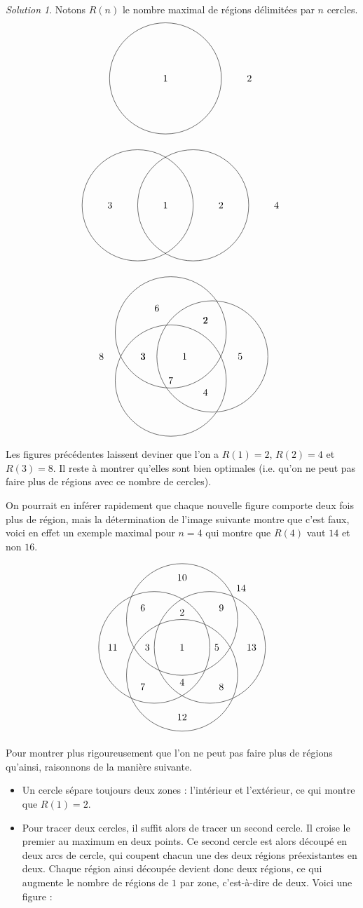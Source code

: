 \documentclass[14pt]{article}
\theoremstyle{remark}
\newtheorem*{sol}{Solution}
\newcounter{n}
\theoremstyle{plain}
\begin{document}
\begin{sol}

Notons $R(n)$ le nombre maximal de régions délimitées par $n$ cercles.
\[\begin{tikzpicture}
\draw (0,0) circle (2);
\draw (0,0) node{$1$};
\draw (3,0) node{$2$};
\end{tikzpicture}\]

\[\begin{tikzpicture}
\draw (0:1) circle (2); 
\draw(180:1) circle (2);
\draw (0,0) node{$1$};
\draw (2,0) node{$2$};
\draw (-2,0) node{$3$};
\draw(4,0) node {$4$};
\end{tikzpicture}\]

\[\begin{tikzpicture}
\draw (0:1) circle (2); 
\draw(120:1) circle (2);
\draw(240:1) circle (2);
\draw(0,0) node{1};
\draw(60:1.5) node{2};
\draw(180:1.5) node{3};
\draw(300:1.5) node{4};
\draw(0:2) node{5};
\draw(120:2) node{6};
\draw(240:1) node{7};
\draw(60:1.5) node{2};
\draw(180:1.5) node{3};
\draw(180:3) node{8};
\end{tikzpicture}\]
Les figures précédentes laissent deviner que l'on a $R(1) =2$, $R(2)=4$ et $R(3)=8$. Il reste à montrer qu'elles sont bien optimales (i.e. qu'on ne peut pas faire plus de régions avec ce nombre de cercles). 

On pourrait en inférer rapidement que chaque nouvelle figure comporte deux fois plus de région, mais la détermination de l'image suivante montre que c'est faux, voici en effet un exemple maximal pour $n=4$ qui montre que $R(4)$ vaut $14$ et non $16$.  

\[\begin{tikzpicture}
\draw (0:1) circle (2); 
\draw(90:1) circle (2);
\draw(180:1) circle (2);
\draw(270:1) circle (2);
\draw(0,0) node{1};
\draw(90:1.25) node{2};
\draw(180:1.25) node{3};
\draw(270:1.25) node{4};
\draw(0:1.25) node{5};
\draw(135:2) node{6};
\draw(225:2) node{7};
\draw(315:2) node{8};
\draw(45:2) node{9};
\draw(90:2.5) node{10};
\draw(180:2.5) node{11};
\draw(270:2.5) node{12};
\draw(0:2.5) node{13};
\draw(45:3) node{14};
\end{tikzpicture}\]

Pour montrer plus rigoureusement que l'on ne peut pas faire plus de régions qu'ainsi, raisonnons de la manière suivante.\begin{itemize}
\item Un cercle sépare toujours deux zones : l'intérieur et l'extérieur, ce qui montre que $R(1)=2$.
\item Pour tracer deux cercles, il suffit alors de tracer un second cercle. Il croise le premier au maximum en deux points. Ce second cercle est alors découpé en deux arcs de cercle, qui coupent chacun une des deux régions préexistantes en deux. Chaque région ainsi découpée devient donc deux régions, ce qui augmente le nombre de régions de $1$ par zone, c'est-à-dire de deux. Voici une figure : 


\end{itemize}
\end{sol}
\end{document}
